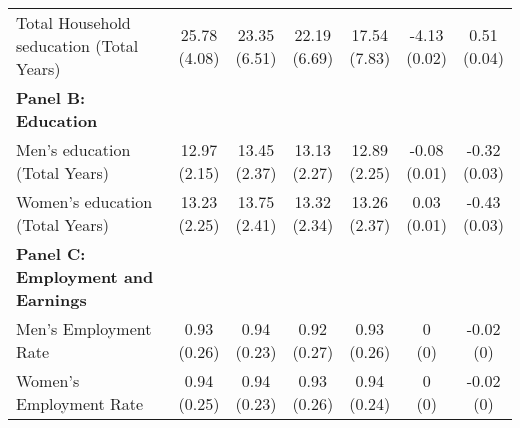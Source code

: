 \begin{table}[!h]
{\begin{threeparttable}
\begin{tabular}[t]{lcccccc}
\hspace{1em}Total Household seducation (Total Years) & \specialcell{25.78\\(4.08)} & \specialcell{23.35\\(6.51)} & \specialcell{22.19\\(6.69)} & \specialcell{17.54\\(7.83)} & \specialcell{-4.13\\(0.02)} & \specialcell{0.51\\(0.04)}\\
\textbf{Panel B: Education} & \textbf{} & \textbf{} & \textbf{} & \textbf{} & \textbf{} & \textbf{}\\
\addlinespace
\hspace{1em}Men’s education (Total Years) & \specialcell{12.97\\(2.15)} & \specialcell{13.45\\(2.37)} & \specialcell{13.13\\(2.27)} & \specialcell{12.89\\(2.25)} & \specialcell{-0.08\\(0.01)} & \specialcell{-0.32\\(0.03)}\\
\hspace{1em}Women’s education (Total Years) & \specialcell{13.23\\(2.25)} & \specialcell{13.75\\(2.41)} & \specialcell{13.32\\(2.34)} & \specialcell{13.26\\(2.37)} & \specialcell{0.03\\(0.01)} & \specialcell{-0.43\\(0.03)}\\
\textbf{Panel C: Employment and Earnings} & \textbf{} & \textbf{} & \textbf{} & \textbf{} & \textbf{} & \textbf{}\\
\hspace{1em}Men’s Employment Rate & \specialcell{0.93\\(0.26)} & \specialcell{0.94\\(0.23)} & \specialcell{0.92\\(0.27)} & \specialcell{0.93\\(0.26)} & \specialcell{0\\(0)} & \specialcell{-0.02\\(0)}\\
\hspace{1em}Women’s Employment Rate & \specialcell{0.94\\(0.25)} & \specialcell{0.94\\(0.23)} & \specialcell{0.93\\(0.26)} & \specialcell{0.94\\(0.24)} & \specialcell{0\\(0)} & \specialcell{-0.02\\(0)}\\

\end{tabular}
\end{threeparttable}}
\end{table}
